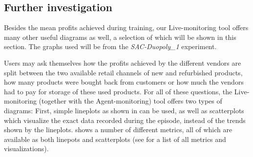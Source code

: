 \subsection{Further investigation}

Besides the mean profits achieved during training, our Live-monitoring tool offers many other useful diagrams as well, a selection of which will be shown in this section. The graphs used will be from the \emph{SAC-Duopoly\_1} experiment.

Users may ask themselves how the profits achieved by the different vendors are split between the two available retail channels of new and refurbished products, how many products were bought back from customers or how much the vendors had to pay for storage of these used products. For all of these questions, the Live-monitoring (together with the Agent-monitoring) tool offers two types of diagrams: First, simple lineplots as shown in  can be used, as well as scatterplots which visualize the exact data recorded during the episode, instead of the trends shown by the lineplots.  shows a number of different metrics, all of which are available as both linepots and scatterplots (see  for a list of all metrics and visualizations).

